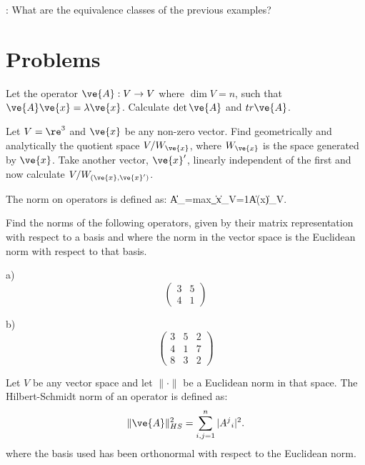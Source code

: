 {{\espa
\ejer: What are the equivalence classes of the previous examples?
}




\section{Problems}


\bpro
Let the operator $\ve{A}: V \to V$ where $\dim V=n$, such that $\ve{A}\ve{x} = \lambda \ve{x}$. Calculate $\det{\ve{A}}$ and $tr\ve{A}$.
\epro

\bpro
Let $V=\re^3$ and $\ve{x}$ be any non-zero vector. Find geometrically and analytically the quotient space $V/W_{\ve{x}}$, where 
$W_{\ve{x}}$ is the space generated by $\ve{x}$. Take another vector, $\ve{x}'$,
linearly independent of the first and now calculate 
$V/W_{(\ve{x},\ve{x}')}$.
\epro

\bpro
The norm on operators is defined as:
\beq
\|A\|_{\cL}=\mbox{max}_{\|\ve x\|_V=1}\|A(\ve x)\|_V.
\eeq

Find the norms of the following operators, given by their
matrix representation with respect to a basis and where the norm in the 
vector space is the Euclidean norm with respect to that basis. 

a)
\begin{equation}
  \left(
    \begin{array}{cc}
      3 & 5  \\
      4 & 1 
    \end{array}
  \right)
\end{equation}

b)
\begin{equation}
  \left(
    \begin{array}{ccc}
      3 & 5 & 2 \\
      4 & 1 & 7 \\
      8 & 3 & 2
    \end{array}
  \right)
\end{equation}

\epro


\bpro
Let $V$ be any vector space and let $\|\cdot\|$ be a Euclidean norm in that
space. The Hilbert-Schmidt norm of an operator is defined as:
\begin{equation}
  \label{eq:Hilbert_Schmidt}
  \|\ve{A}\|_{HS}^2 = \sum_{i,j=1}^n |A^j{}_i|^2.
\end{equation}
where the basis used has been orthonormal with respect to the Euclidean norm.

}
